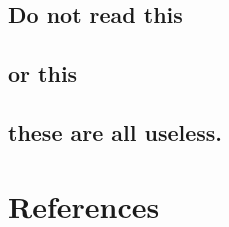 \documentclass[12pt]{article}%
\begin{document}
\subsection{Do not read this}
\lipsum[1-3]

\subsection{or this}
\lipsum[4]

\subsection{these are all useless.}
\lipsum[5]

\section*{References}
\printbibliography[title= \vspace{-1.5cm}]

\end{document}
